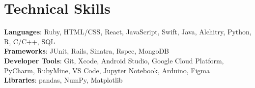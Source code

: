\documentclass[letterpaper,11pt]{article}
\begin{document}

\section{Technical Skills}
 \begin{itemize}[leftmargin=0.15in, label={}]
    \small{\item{
     \textbf{Languages}{: Ruby, HTML/CSS, React, JavaScript, Swift, Java, Alchitry, Python, R, C/C++, SQL} \\
     \textbf{Frameworks}{: JUnit, Rails, Sinatra, Rspec, MongoDB} \\
     \textbf{Developer Tools}{: Git, Xcode, Android Studio, Google Cloud Platform, PyCharm, RubyMine, VS Code, Jupyter Notebook, Arduino, Figma} \\
     \textbf{Libraries}{: pandas, NumPy, Matplotlib}
    }}
 \end{itemize}
\end{document}
